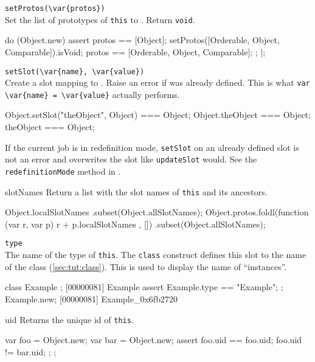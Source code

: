 \begin{urbiscriptapi}
\item \lstinline|setProtos(\var{protos})|\\
  Set the list of prototypes of \lstinline|this| to .
  Return \lstinline|void|.
\begin{urbiscript}
do (Object.new)
{
  assert
  {
    protos == [Object];
    setProtos([Orderable, Object, Comparable]).isVoid;
    protos == [Orderable, Object, Comparable];
  };
}|;
\end{urbiscript}

\item \lstinline|setSlot(\var{name}, \var{value})|\\
  Create a slot  mapping to . Raise an error if
   was already defined.  This is what
  \lstinline|var \var{name} = \var{value}| actually performs.
\begin{urbiassert}
Object.setSlot("theObject", Object) === Object;
Object.theObject === Object;
theObject === Object;
\end{urbiassert}

  If the current job is in redefinition mode, \lstinline|setSlot| on
  an already defined slot is not an error and overwrites the slot like
  \lstinline|updateSlot| would. See the \lstinline|redefinitionMode|
  method in .

\item[slotNames]
  Return a list with the slot names of \lstinline|this| and its
  ancestors.
\begin{urbiassert}
Object.localSlotNames
  .subset(Object.allSlotNames);
Object.protos.foldl(function (var r, var p) { r + p.localSlotNames },
                    [])
  .subset(Object.allSlotNames);
\end{urbiassert}

\item \lstinline|type|\\ %
  The name of the type of \lstinline|this|.  The \lstinline|class|
  construct defines this slot to the name of the class
  (\autoref{sec:tut:class}).  This is used to display the name of
  ``instances''.
\begin{urbiscript}
class Example {};
[00000081] Example
assert
{
  Example.type == "Example";
};
Example.new;
[00000081] Example_0x6fb2720
\end{urbiscript}

\item[uid]
  Returns the unique id of \lstinline|this|.
\begin{urbiscript}
{
  var foo = Object.new;
  var bar = Object.new;
  assert
  {
    foo.uid == foo.uid;
    foo.uid != bar.uid;
  };
};
\end{urbiscript}


\end{urbiscriptapi}
